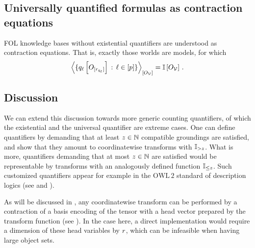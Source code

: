 \subsection{Universally quantified formulas as contraction equations}


FOL knowledge bases without existential quantifiers are understood as contraction equations.
That is, exactly those worlds are models, for which
\begin{align*}
    \left\langle 
        \{q_{\ell}\left[O_{[r_{q_{\ell}}]}\right] \,:\, \ell\in[p]\}
    \right\rangle_{\left[ O_{\mathcal{V}} \right]}
    = \mathbb{I}\left[O_{\mathcal{V}}\right] \, .
\end{align*}





\subsection{Discussion}

We can extend this discussion towards more generic counting quantifiers, of which the existential and the universal quantifier are extreme cases.
One can define quantifiers by demanding that at least $z\in\mathbb{N}$ compatible groundings are satisfied, and show that they amount to coordinatewise transforms with $\mathbb{I}_{>z}$.
What is more, quantifiers demanding that at most $z\in\mathbb{N}$ are satisfied would be representable by transforms with an analogously defined function $\mathbb{I}_{\leq z}$.
Such customized quantifiers appear for example in the $\mathrm{OWL\,2}$ standard of description logics (see \cite{rudolph_foundations_2011} and ).

As will be discussed in , any coordinatewise transform can be performed by a contraction of a basis encoding of the tensor with a head vector prepared by the transform function (see ).
In the case here, a direct implementation would require a dimension of these head variables by $r$, which can be infeasible when having large object sets.

